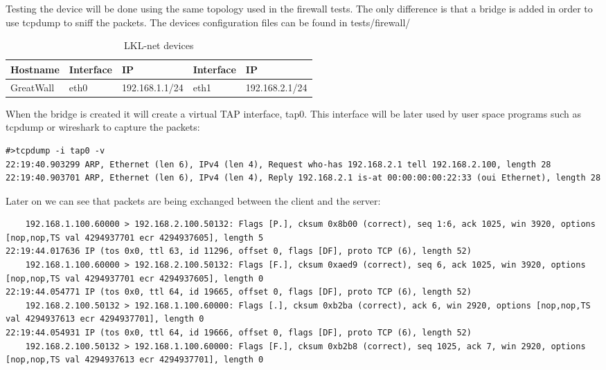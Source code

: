 Testing the device will be done using the same topology used in the firewall tests. The only difference
is that a bridge is added in order to use tcpdump to sniff the packets. The devices configuration files
can be found in tests/firewall/


\begin{center}
  \begin{table}[htb]
  \begin{center}
  \begin{tabular}{| l | l | l | l | l |}
    \hline
      Hostname & Interface & IP & Interface & IP \\ \hline
      GreatWall & eth0 & 192.168.1.1/24 & eth1 & 192.168.2.1/24 \\ 
    \hline
  \end{tabular}
  \end{center}
  \caption{LKL-net devices}
  \label{table:tdevices}
  \end{table}
\end{center}

When the bridge is created it will create a virtual TAP interface,  tap0. This interface will be later used
by user space programs such as tcpdump or wireshark to capture the packets:

\begin{lstlisting}
#>tcpdump -i tap0 -v
22:19:40.903299 ARP, Ethernet (len 6), IPv4 (len 4), Request who-has 192.168.2.1 tell 192.168.2.100, length 28
22:19:40.903701 ARP, Ethernet (len 6), IPv4 (len 4), Reply 192.168.2.1 is-at 00:00:00:00:22:33 (oui Ethernet), length 28
\end{lstlisting}

Later on we can see that packets are being exchanged between the client and the server:

\begin{lstlisting}
    192.168.1.100.60000 > 192.168.2.100.50132: Flags [P.], cksum 0x8b00 (correct), seq 1:6, ack 1025, win 3920, options [nop,nop,TS val 4294937701 ecr 4294937605], length 5
22:19:44.017636 IP (tos 0x0, ttl 63, id 11296, offset 0, flags [DF], proto TCP (6), length 52)
    192.168.1.100.60000 > 192.168.2.100.50132: Flags [F.], cksum 0xaed9 (correct), seq 6, ack 1025, win 3920, options [nop,nop,TS val 4294937701 ecr 4294937605], length 0
22:19:44.054771 IP (tos 0x0, ttl 64, id 19665, offset 0, flags [DF], proto TCP (6), length 52)
    192.168.2.100.50132 > 192.168.1.100.60000: Flags [.], cksum 0xb2ba (correct), ack 6, win 2920, options [nop,nop,TS val 4294937613 ecr 4294937701], length 0
22:19:44.054931 IP (tos 0x0, ttl 64, id 19666, offset 0, flags [DF], proto TCP (6), length 52)
    192.168.2.100.50132 > 192.168.1.100.60000: Flags [F.], cksum 0xb2b8 (correct), seq 1025, ack 7, win 2920, options [nop,nop,TS val 4294937613 ecr 4294937701], length 0
\end{lstlisting}

